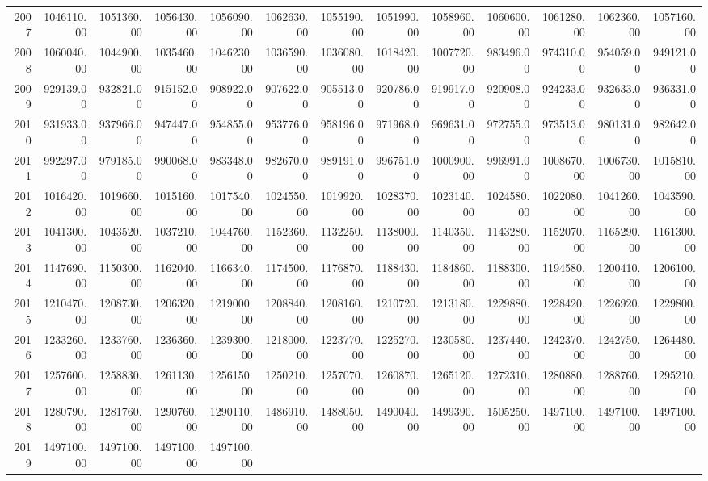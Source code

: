 \begin{longtable}{rrrrrrrrrrrrr}
  2007 & 1046110.00 & 1051360.00 & 1056430.00 & 1056090.00 & 1062630.00 & 1055190.00 & 1051990.00 & 1058960.00 & 1060600.00 & 1061280.00 & 1062360.00 & 1057160.00 \\ 
  2008 & 1060040.00 & 1044900.00 & 1035460.00 & 1046230.00 & 1036590.00 & 1036080.00 & 1018420.00 & 1007720.00 & 983496.00 & 974310.00 & 954059.00 & 949121.00 \\ 
  2009 & 929139.00 & 932821.00 & 915152.00 & 908922.00 & 907622.00 & 905513.00 & 920786.00 & 919917.00 & 920908.00 & 924233.00 & 932633.00 & 936331.00 \\ 
  2010 & 931933.00 & 937966.00 & 947447.00 & 954855.00 & 953776.00 & 958196.00 & 971968.00 & 969631.00 & 972755.00 & 973513.00 & 980131.00 & 982642.00 \\ 
  2011 & 992297.00 & 979185.00 & 990068.00 & 983348.00 & 982670.00 & 989191.00 & 996751.00 & 1000900.00 & 996991.00 & 1008670.00 & 1006730.00 & 1015810.00 \\ 
  2012 & 1016420.00 & 1019660.00 & 1015160.00 & 1017540.00 & 1024550.00 & 1019920.00 & 1028370.00 & 1023140.00 & 1024580.00 & 1022080.00 & 1041260.00 & 1043590.00 \\ 
  2013 & 1041300.00 & 1043520.00 & 1037210.00 & 1044760.00 & 1152360.00 & 1132250.00 & 1138000.00 & 1140350.00 & 1143280.00 & 1152070.00 & 1165290.00 & 1161300.00 \\ 
  2014 & 1147690.00 & 1150300.00 & 1162040.00 & 1166340.00 & 1174500.00 & 1176870.00 & 1188430.00 & 1184860.00 & 1188300.00 & 1194580.00 & 1200410.00 & 1206100.00 \\ 
  2015 & 1210470.00 & 1208730.00 & 1206320.00 & 1219000.00 & 1208840.00 & 1208160.00 & 1210720.00 & 1213180.00 & 1229880.00 & 1228420.00 & 1226920.00 & 1229800.00 \\ 
  2016 & 1233260.00 & 1233760.00 & 1236360.00 & 1239300.00 & 1218000.00 & 1223770.00 & 1225270.00 & 1230580.00 & 1237440.00 & 1242370.00 & 1242750.00 & 1264480.00 \\ 
  2017 & 1257600.00 & 1258830.00 & 1261130.00 & 1256150.00 & 1250210.00 & 1257070.00 & 1260870.00 & 1265120.00 & 1272310.00 & 1280880.00 & 1288760.00 & 1295210.00 \\ 
  2018 & 1280790.00 & 1281760.00 & 1290760.00 & 1290110.00 & 1486910.00 & 1488050.00 & 1490040.00 & 1499390.00 & 1505250.00 & 1497100.00 & 1497100.00 & 1497100.00 \\ 
  2019 & 1497100.00 & 1497100.00 & 1497100.00 & 1497100.00 &  &  &  &  &  &  &  &  \\ 
   \hline
\hline
\end{longtable}
